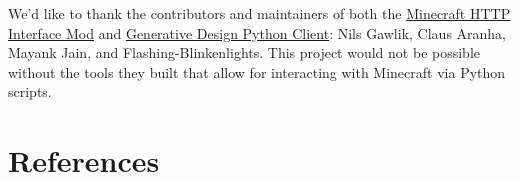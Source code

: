 \documentclass[11pt, oneside]{article}
\begin{document}
\begin{normalsize}
We'd like to thank the contributors and maintainers of both the \href{https://github.com/nilsgawlik/gdmc_http_interface}{Minecraft HTTP Interface Mod} and \href{https://github.com/nilsgawlik/gdmc_http_client_python}{Generative Design Python Client}: Nils Gawlik, Claus Aranha, Mayank Jain, and Flashing-Blinkenlights. This project would not be possible without the tools they built that allow for interacting with Minecraft via Python scripts.

\newpage

\section{References}
\label{references}
\nocite{*}
\printbibliography[heading=none]

\end{normalsize}
\end{document}
